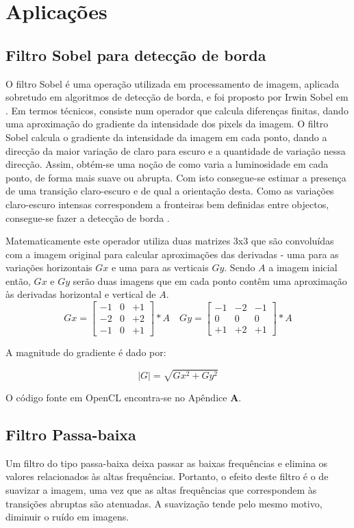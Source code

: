 \section{Aplicações}
\subsection{Filtro Sobel para detecção de borda}
\label{sec:sobel}
O filtro Sobel é uma operação utilizada em processamento de imagem, aplicada sobretudo em algoritmos de detecção de borda, e foi proposto por Irwin Sobel em \cite{Sobel:1970:CMM:905376}. Em termos técnicos, consiste num operador que calcula diferenças finitas, dando uma aproximação do gradiente da intensidade dos pixels da imagem. O filtro Sobel calcula o gradiente da intensidade da imagem em cada ponto, dando a direcção da maior variação de claro para escuro e a quantidade de variação nessa direcção. Assim, obtém-se uma noção de como varia a luminosidade em cada ponto, de forma mais suave ou abrupta. Com isto consegue-se estimar a presença de uma transição claro-escuro e de qual a orientação desta. Como as variações claro-escuro intensas correspondem a fronteiras bem definidas entre objectos, consegue-se fazer a detecção de borda \cite{Gonzalez:2006:DIP:1076432}.

Matematicamente este operador utiliza duas matrizes 3x3 que são convoluídas com a imagem original para calcular aproximações das derivadas - uma para as variações horizontais $Gx$ e uma para as verticais $Gy$. Sendo $A$ a imagem inicial então, $Gx$  e $Gy$  serão duas imagens que em cada ponto contêm uma aproximação às derivadas horizontal e vertical de $A$.
$$
Gx=\left[\begin{array}{rrr}
-1&0&+1\\
-2&0&+2 \\
-1&0&+1
\end{array}\right]*A\quad
Gy=\left[\begin{array}{ccc}
-1&-2&-1\\
 0& 0& 0 \\
+1&+2&+1
\end{array}\right]*A
$$

A magnitude do gradiente é dado por:

$$
|G|=\sqrt{Gx^2 + Gy^2}
$$

O código fonte em OpenCL encontra-se no Apêndice \textbf{A}.
\subsection{Filtro Passa-baixa}
\label{sec:passa_baixa}
Um filtro do tipo passa-baixa deixa passar as baixas frequências e elimina os valores relacionados às altas frequências. Portanto, o efeito deste filtro é o de suavizar a imagem, uma vez que as altas frequências que correspondem às transições abruptas são atenuadas. A suavização tende pelo mesmo motivo, diminuir o ruído em imagens.
\cite{Gonzalez:2006:DIP:1076432}

